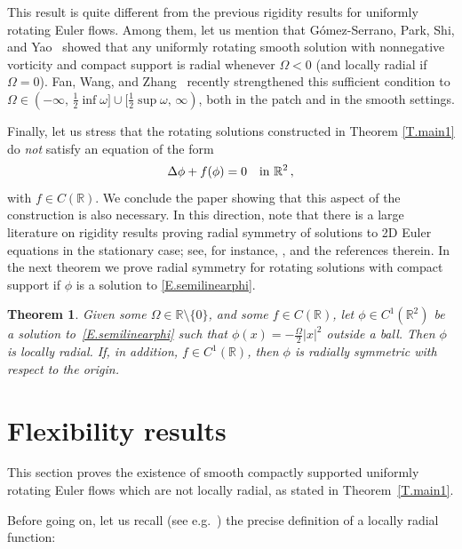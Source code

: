\documentclass[11pt,oneside]{amsart}
\newtheorem{theorem}{Theorem}%
\theoremstyle{definition}
\newcommand{\Om}{\Omega}
\def\RR{\mathbb{R}}
\numberwithin{equation}{section}
\begin{document}
This result is quite different from the previous rigidity results for uniformly rotating Euler flows. Among them, let us mention that G\'omez-Serrano, Park, Shi, and Yao~\cite{GPSY} showed that any uniformly rotating smooth solution with nonnegative vorticity and compact support is radial whenever $\Omega< 0$ (and locally radial if $\Omega=0$). Fan, Wang, and Zhang~\cite{FanWangZhan25} recently strengthened this sufficient condition to $\Omega \in (-\infty,\,\tfrac{1}{2}\inf \omega] \cup [\tfrac{1}{2}\sup \omega,\,\infty)$, both in the patch and in the smooth settings.


Finally, let us stress that the rotating solutions constructed in Theorem \ref{T.main1} do {\em not}\/ satisfy an equation of the form
\begin{equation}\label{E.semilinearphi}
	\Delta \phi + f(\phi ) = 0 \quad \textup{in } \RR^2\,,
\end{equation}
with $f\in C(\RR)$. We conclude the paper showing that this aspect of the construction is also necessary. In this direction, note that there is a large literature on rigidity results proving radial symmetry of solutions to 2D Euler equations in the stationary case; see, for instance, \cite{GPSY, R, Hamel, DeR-E-R, wang}, and the references therein. In the next theorem we prove radial symmetry for rotating solutions with compact support if $\phi$ is a solution to \eqref{E.semilinearphi}. 

\begin{theorem} \label{T.Rigidity1}
     Given some $\Om \in \RR \setminus \{0\}$, and some $f\in C(\RR)$, let $\phi \in C^{1}(\RR^2)$ be a solution to~\eqref{E.semilinearphi} such that
     $\phi(x)= - \frac{\Om}{2}|x|^2 
     $
     outside a ball. Then $\phi$ is locally radial. If, in addition, $f \in C^1(\RR)$, then $\phi$ is radially symmetric with respect to the origin.
\end{theorem}


\section{Flexibility results} \label{S.Flexibility}

This section proves the existence of smooth compactly supported uniformly rotating Euler flows which are not locally radial, as stated in Theorem~\ref{T.main1}. 

Before going on, let us recall (see e.g.~\cite[Section 6]{Brock}) the precise definition of a locally radial function:
\end{document}
